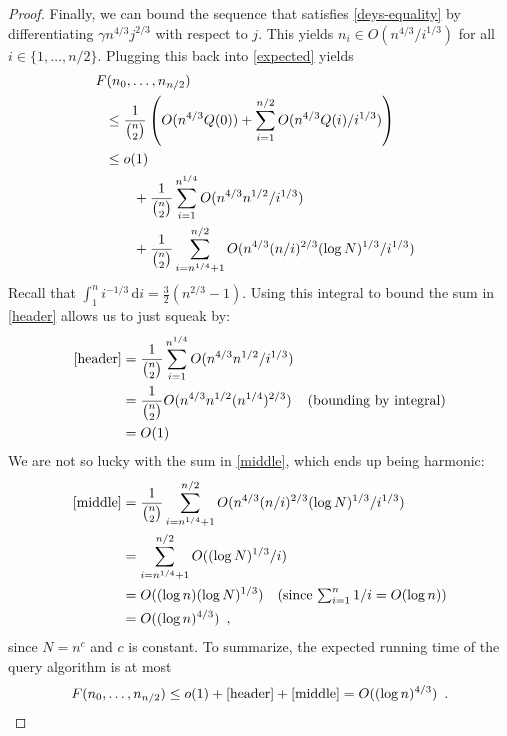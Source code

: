 \documentclass{cccg12}
\begin{document}
\begin{proof}
  Finally, we can bound the sequence that satisfies \eqref{deys-equality}
  by differentiating $\gamma n^{4/3}j^{2/3}$ with respect to $j$.
  This yields $n_i \in O(n^{4/3}/i^{1/3})$ for all $i\in\{1,\ldots,n/2\}$.
  Plugging this back into \eqref{expected} yields
  \begin{align}
     & \!\!\!\! F(n_0,\ldots,n_{n/2}) \\
      & \le \frac{1}{\binom{n}{2}}\left(O(n^{4/3}Q(0))+\sum_{i=1}^{n/2} O(n^{4/3}Q(i)/i^{1/3})\right) \notag \\
      & \le o(1) \notag \\
      & \qquad {} + \frac{1}{\binom{n}{2}}\sum_{i=1}^{n^{1/4}} O(n^{4/3}n^{1/2}/i^{1/3})  \eqlabel{header}\\
      & \qquad {} + \frac{1}{\binom{n}{2}}\sum_{i=n^{1/4}+1}^{n/2}O(n^{4/3}(n/i)^{2/3}(\log N)^{1/3}/i^{1/3}) \eqlabel{middle} 
  \end{align}
  Recall that $\int_1^n i^{-1/3}\,\mathrm{d}i = \frac{3}{2}(n^{2/3}-1)$.
  Using this integral to bound the sum in \eqref{header}
  allows us to just squeak by:
  \begin{align*}
    \eqref{header} & = \frac{1}{\binom{n}{2}}\sum_{i=1}^{n^{1/4}} O(n^{4/3}n^{1/2}/i^{1/3}) \\
        & = \frac{1}{\binom{n}{2}}O(n^{4/3}n^{1/2}(n^{1/4})^{2/3})
           & \text{(bounding by integral)}  \\
        & = O(1) \\
  \end{align*}
  We are not so lucky with the sum in \eqref{middle}, which ends up
  being harmonic:
  \begin{align*}
    \eqref{middle} 
      & = \frac{1}{\binom{n}{2}}\sum_{i=n^{1/4}+1}^{n/2}O(n^{4/3}(n/i)^{2/3}(\log N)^{1/3}/i^{1/3}) \\
      & = 
       \sum_{i=n^{1/4}+1}^{n/2}O((\log N)^{1/3}/i) \\
      & = O((\log n)(\log N)^{1/3})  \quad \mbox{(since $\sum_{i=1}^n 1/i=O(\log n)$)} \\
      & = O((\log n)^{4/3}) \enspace ,
  \end{align*}
  since $N=n^c$ and $c$ is constant.
  To summarize, the expected running time of the query algorithm is at most
  \[ 
     F(n_0,\ldots,n_{n/2}) \le o(1)+\eqref{header} + \eqref{middle} 
     = O((\log n)^{4/3}) \enspace . \qedhere
  \]
\end{proof}
\end{document}
